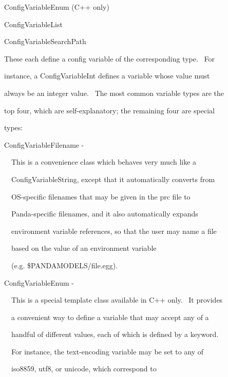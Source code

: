 \documentclass[a4paper]{article}
\begin{document}
{\color{black}
ConfigVariableEnum (C++ only)}

{\color{black}
ConfigVariableList}

{\color{black}
ConfigVariableSearchPath}


\bigskip

{\color{black}
These each define a config variable of the corresponding type. \ For}

{\color{black}
instance, a ConfigVariableInt defines a variable whose value must}

{\color{black}
always be an integer value. \ The most common variable types are the}

{\color{black}
top four, which are self-explanatory; the remaining four are special}

{\color{black}
types:}


\bigskip

{\color{black}
ConfigVariableFilename -}


\bigskip

{\color{black}
\ \ This is a convenience class which behaves very much like a}

{\color{black}
\ \ ConfigVariableString, except that it automatically converts from}

{\color{black}
\ \ OS-specific filenames that may be given in the prc file to}

{\color{black}
\ \ Panda-specific filenames, and it also automatically expands}

{\color{black}
\ \ environment variable references, so that the user may name a file}

{\color{black}
\ \ based on the value of an environment variable}

{\color{black}
\ \ (e.g. \$PANDAMODELS/file.egg).}


\bigskip

{\color{black}
ConfigVariableEnum -}


\bigskip

{\color{black}
\ \ This is a special template class available in C++ only. \ It provides}

{\color{black}
\ \ a convenient way to define a variable that may accept any of a}

{\color{black}
\ \ handful of different values, each of which is defined by a keyword.}

{\color{black}
\ \ For instance, the text-encoding variable may be set to any of}

{\color{black}
\ \ {\textquotedbl}iso8859{\textquotedbl}, {\textquotedbl}utf8{\textquotedbl}, or {\textquotedbl}unicode{\textquotedbl},
which correspond to}
\end{document}
